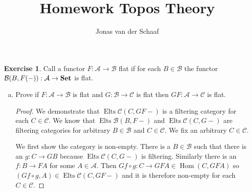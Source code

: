 \documentclass{article}
\title{Homework Topos Theory}
\author{Jonas van der Schaaf}
\date{}
\DeclareMathOperator{\Hom}{Hom}
\newcommand{\setcat}{{\bf Set}}
\DeclareMathOperator{\elements}{Elts}
\theoremstyle{definition}
\newtheorem{question}{Exercise}
\begin{document}
\maketitle

\begin{question}
    Call a functor \(F:\mathcal{A}\to\mathcal{B}\) flat if for each
    \(B\in\mathcal{B}\) the functor
    \(\mathcal{B}(B,F(-)):\mathcal{A}\to\setcat\) is flat.

    \begin{enumerate}[(a)]
        \item Prove if \(F:\mathcal{A}\to\mathcal{B}\) is flat and
              \(G:\mathcal{B}\to\mathcal{C}\) is flat then
              \(GF:\mathcal{A}\to\mathcal{C}\) is flat.

              \begin{proof}
                  We demonstrate that \(\elements\mathcal{C}(C,GF-)\) is a
                  filtering category for each \(C\in\mathcal{C}\). We know that
                  \(\elements\mathcal{B}(B,F-)\) and
                  \(\elements\mathcal{C}(C,G-)\) are filtering categories for
                  arbitrary \(B\in\mathcal{B}\) and \(C\in\mathcal{C}\). We fix
                  an arbitrary \(C\in\mathcal{C}\).

                  We first show the category is non-empty. There is a
                  \(B\in\mathcal{B}\) such that there is an \(g:C\to GB\)
                  because \(\elements\mathcal{C}(C,G-)\) is filtering. Similarly
                  there is an \(f:B\to FA\) for some \(A\in\mathcal{A}\). Then
                  \(Gf\circ g:C\to GFA\in\Hom(C,GFA)\) so \((Gf\circ
                  g,A)\in\elements\mathcal{C}(C,GF-)\) and it is therefore
                  non-empty for each \(C\in\mathcal{C}\).


\end{proof}
\end{enumerate}
\end{question}
\end{document}
